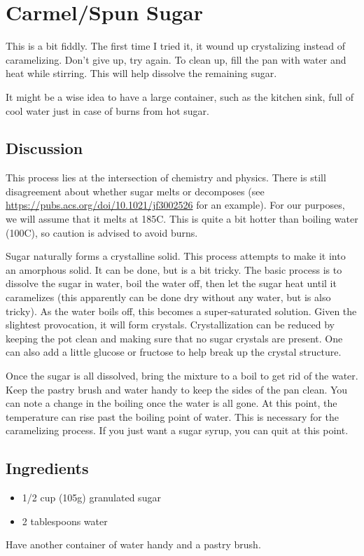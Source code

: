 \documentclass[10pt, openany]{book}
\begin{document}
\section{Carmel/Spun Sugar}
This is a bit fiddly.  The first time I tried it, it wound up crystalizing instead of caramelizing.  Don't give up, try again.  To clean up, fill the pan with water and heat while stirring.  This will help dissolve the remaining sugar.

It might be a wise idea to have a large container, such as the kitchen sink, full of cool water just in case of burns from hot sugar.

\subsection{Discussion}
This process lies at the intersection of chemistry and physics.  There is still disagreement about whether sugar melts or decomposes (see \url{https://pubs.acs.org/doi/10.1021/jf3002526} for an example).  For our purposes, we will assume that it melts at 185\degree{}C.  This is quite a bit hotter than boiling water (100\degree{}C), so caution is advised to avoid burns.

Sugar naturally forms a crystalline solid.  This process attempts to make it into an amorphous solid.  It can be done, but is a bit tricky.  The basic process is to dissolve the sugar in water, boil the water off, then let the sugar heat until it caramelizes (this apparently can be done dry without any water, but is also tricky).  As the water boils off, this becomes a super-saturated solution.  Given the slightest provocation, it will form crystals.  Crystallization can be reduced by keeping the pot clean and making sure that no sugar crystals are present.  One can also add a little glucose or fructose to help break up the crystal structure.

Once the sugar is all dissolved, bring the mixture to a boil to get rid of the water.  Keep the pastry brush and water handy to keep the sides of the pan clean.  You can note a change in the boiling once the water is all gone.  At this point, the temperature can rise past the boiling point of water.  This is necessary for the caramelizing process.  If you just want a sugar syrup, you can quit at this point.

\subsection{Ingredients}
\begin{itemize}
  \item 1/2 cup (105g) granulated sugar
  \item 2 tablespoons water
\end{itemize}
Have another container of water handy and a pastry brush.
\end{document}
